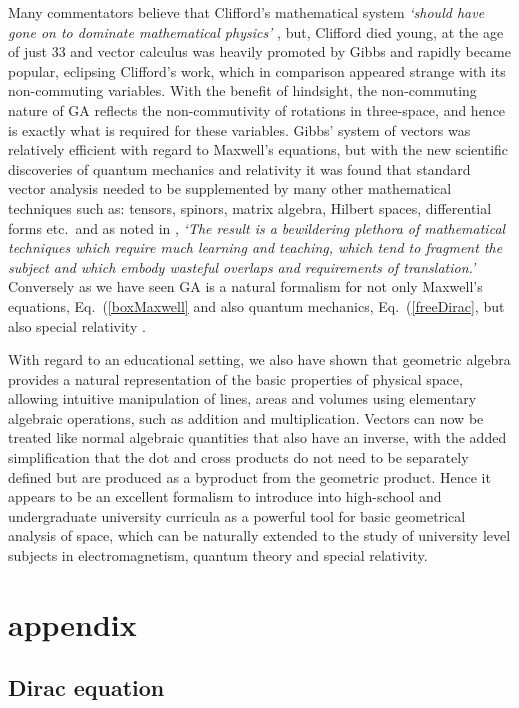 \documentclass[prb,preprint]{revtex4}
\begin{document}
Many commentators believe that Clifford's mathematical system {\it{`should have gone on to dominate mathematical physics'}} \cite{Doran2003}, but, Clifford died young, at the age of just 33 and vector calculus was heavily promoted by Gibbs and rapidly became popular, eclipsing Clifford's work, which in comparison appeared strange with its non-commuting variables.  With the benefit of hindsight, the non-commuting nature of GA reflects the non-commutivity of rotations in three-space, and hence is exactly what is required for these variables.  
Gibbs' system of vectors was relatively efficient with regard to Maxwell's equations, but with the new scientific discoveries of quantum mechanics and relativity it was found that standard vector analysis needed to be supplemented by many other mathematical techniques such as: tensors, spinors, matrix algebra, Hilbert spaces, differential forms etc.~and as noted in \cite{Simons:2009}, {\it{`The result is a bewildering plethora of mathematical techniques which require much learning and teaching, which tend to fragment the subject and which embody wasteful overlaps and requirements of translation.'}}  Conversely as we have seen GA is a natural formalism for not only Maxwell's equations, Eq.~(\ref{boxMaxwell} and also quantum mechanics, Eq.~(\ref{freeDirac}, but also special relativity \cite{chappell2011revisiting}.

With regard to an educational setting, we also have shown that geometric algebra provides a natural representation of the basic properties of physical space, allowing intuitive manipulation of lines, areas and volumes using elementary algebraic operations, such as addition and multiplication. Vectors can now be treated like normal algebraic quantities that also have an inverse, with the added simplification that the dot and cross products do not need to be separately defined but are produced as a byproduct from the geometric product.  Hence it appears to be an excellent formalism to introduce into high-school and undergraduate university curricula as a powerful tool for basic geometrical analysis of space, which can be naturally extended to the study of university level subjects in electromagnetism, quantum theory and special relativity.


\section{appendix}


\subsection{Dirac equation}
\end{document}
